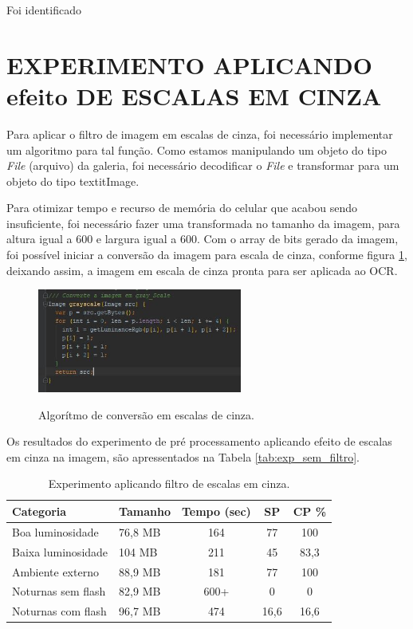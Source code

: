 Foi identificado 


\section{EXPERIMENTO APLICANDO efeito DE ESCALAS EM CINZA}
Para aplicar o filtro de imagem em escalas de cinza, foi necessário implementar um algoritmo para tal função. Como estamos manipulando um objeto do tipo \textit{File} (arquivo) da galeria, foi necessário decodificar o \textit{File} e transformar para um objeto do tipo textit{Image}. 

Para otimizar tempo e recurso de memória do celular que acabou sendo insuficiente, foi necessário fazer uma transformada no tamanho da imagem, para altura igual a 600 e largura igual a 600. Com o array de bits gerado da imagem, foi possível iniciar a conversão da imagem para escala de cinza, conforme figura \ref{fig:greyscale}, deixando assim, a imagem em escala de cinza pronta para ser aplicada ao OCR.




 \begin{figure}[h]
	\centering
	\includegraphics[width=0.6\textwidth]{Imagens/greyscale.JPG} %
	\caption[Algorítmo de conversão em escalas de cinza.]{Algorítmo de conversão em escalas de cinza.}
	\label{fig:greyscale}
\end{figure}

Os resultados do experimento de pré processamento aplicando efeito de escalas em cinza na imagem, são apressentados na Tabela \ref{tab:exp_sem_filtro}.

\begin{table}[]
\caption{Experimento aplicando filtro de escalas em cinza.}
\label{tab:exp_grey_scale}
\centering
\begin{tabular}{llccc}
\hline
Categoria          & Tamanho    & Tempo (sec) & SP  & CP \% \\ \hline
Boa luminosidade   & 76,8 MB & 164     & 77 & 100         \\
Baixa luminosidade & 104 MB & 211     & 45 & 83,3         \\
Ambiente externo   & 88,9 MB & 181     & 77 & 100         \\
Noturnas sem flash & 82,9 MB & 600+     & 0& 0         \\
Noturnas com flash & 96,7 MB & 474     & 16,6 & 16,6         \\ \hline
\end{tabular}
	\label{fig:exp_grey_scale}
\end{table}



